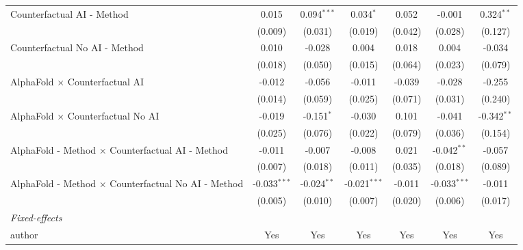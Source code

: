 \begin{tabular}{lcccccc}
   Counterfactual AI - Method                                 & 0.015          & 0.094$^{***}$ & 0.034$^{*}$    & 0.052   & -0.001         & 0.324$^{**}$\\   
                                                              & (0.009)        & (0.031)       & (0.019)        & (0.042) & (0.028)        & (0.127)\\   
   Counterfactual No AI - Method                              & 0.010          & -0.028        & 0.004          & 0.018   & 0.004          & -0.034\\   
                                                              & (0.018)        & (0.050)       & (0.015)        & (0.064) & (0.023)        & (0.079)\\   
   AlphaFold $\times$ Counterfactual AI                       & -0.012         & -0.056        & -0.011         & -0.039  & -0.028         & -0.255\\   
                                                              & (0.014)        & (0.059)       & (0.025)        & (0.071) & (0.031)        & (0.240)\\   
   AlphaFold $\times$ Counterfactual No AI                    & -0.019         & -0.151$^{*}$  & -0.030         & 0.101   & -0.041         & -0.342$^{**}$\\   
                                                              & (0.025)        & (0.076)       & (0.022)        & (0.079) & (0.036)        & (0.154)\\   
   AlphaFold - Method $\times$ Counterfactual AI - Method     & -0.011         & -0.007        & -0.008         & 0.021   & -0.042$^{**}$  & -0.057\\   
                                                              & (0.007)        & (0.018)       & (0.011)        & (0.035) & (0.018)        & (0.089)\\   
   AlphaFold - Method $\times$ Counterfactual No AI - Method  & -0.033$^{***}$ & -0.024$^{**}$ & -0.021$^{***}$ & -0.011  & -0.033$^{***}$ & -0.011\\   
                                                              & (0.005)        & (0.010)       & (0.007)        & (0.020) & (0.006)        & (0.017)\\   
   \midrule
   \emph{Fixed-effects}\\
   author                                                     & Yes            & Yes           & Yes            & Yes     & Yes            & Yes\\  

\end{tabular}
